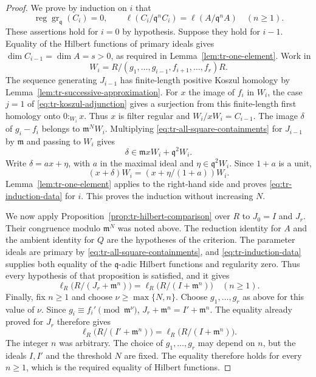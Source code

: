 \documentclass[11pt,reqno]{amsart}
\numberwithin{equation}{section}
\theoremstyle{definition}
\begin{document}
\begin{proof}
We prove by induction on $i$ that
\begin{equation}\label{eq:tr-induction-data}
 \operatorname{reg}\operatorname{gr}_{\mathfrak q}(C_i)=0,
 \qquad
 \ell(C_i/\mathfrak q^nC_i)=\ell(A/\mathfrak q^nA)
 \quad(n\geq1).
\end{equation}
These assertions hold for $i=0$ by hypothesis.
Suppose they hold for $i-1$. Equality of the Hilbert functions of
primary ideals gives $\dim C_{i-1}=\dim A=s>0$, as required in
Lemma~\ref{lem:tr-one-element}. Work in
\[
 W_i=R/(g_1,\ldots,g_{i-1},f_{i+1},\ldots,f_r)R.
\]
The sequence generating $J_{i-1}$ has finite-length positive
Koszul homology by Lemma~\ref{lem:tr-successive-approximation}.
For $x$ the image of $f_i$ in $W_i$, the case $j=1$ of
\eqref{eq:tr-koszul-adjunction} gives a surjection from this finite-length
first homology onto $0:_{W_i}x$. Thus $x$ is filter regular and
$W_i/xW_i=C_{i-1}$.
The image $\delta$ of $g_i-f_i$ belongs to $\mathfrak m^NW_i$.
Multiplying \eqref{eq:tr-all-square-containments} for $J_{i-1}$
by $\mathfrak m$ and passing to $W_i$ gives
\[
 \delta\in\mathfrak m xW_i+\mathfrak q^2W_i.
\]
Write $\delta=ax+\eta$, with $a$ in the maximal ideal and
$\eta\in\mathfrak q^2W_i$. Since $1+a$ is a unit,
\[
 (x+\delta)W_i=(x+\eta/(1+a))W_i.
\]
Lemma~\ref{lem:tr-one-element} applies to the right-hand side and
proves \eqref{eq:tr-induction-data} for $i$.
This proves the induction without increasing $N$.

We now apply Proposition~\ref{prop:tr-hilbert-comparison} over $R$
to $J_0=I$ and $J_r$. Their congruence modulo $\mathfrak m^N$
was noted above. The reduction identity for $A$ and the ambient identity for $Q$
are the hypotheses of the criterion. The parameter ideals are
primary by \eqref{eq:tr-all-square-containments}, and
\eqref{eq:tr-induction-data} supplies both equality of the
$\mathfrak q$-adic Hilbert functions and regularity zero.
Thus every hypothesis of that proposition is satisfied, and it gives
\[
 \ell_R\bigl(R/(J_r+\mathfrak m^n)\bigr)
   =\ell_R\bigl(R/(I+\mathfrak m^n)\bigr)
 \quad(n\geq1).
\]
Finally, fix $n\geq1$ and choose $\nu\geq\max\{N,n\}$.
Choose $g_1,\ldots,g_r$ as above for this value of $\nu$.
Since $g_i\equiv f_i'\pmod{\mathfrak m^\nu}$,
$J_r+\mathfrak m^n=I'+\mathfrak m^n$.
The equality already proved for $J_r$ therefore gives
\[
 \ell_R\bigl(R/(I'+\mathfrak m^n)\bigr)
 =\ell_R\bigl(R/(I+\mathfrak m^n)\bigr).
\]
The integer $n$ was arbitrary.
The choice of $g_1,\ldots,g_r$ may depend on $n$,
but the ideals $I,I'$ and the threshold $N$ are fixed.
The equality therefore holds for every $n\geq1$,
which is the required equality of Hilbert functions.
\end{proof}
\end{document}

